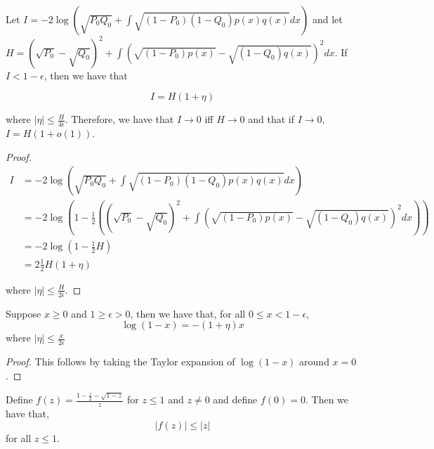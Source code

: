 \documentclass{article}
\begin{document}
\begin{lemma}
\label{lem:renyi_hellinger}
Let $I = -2 \log \left( \sqrt{P_0 Q_0} + \int \sqrt{(1-P_0)(1-Q_0) p(x) q(x)} dx \right)$ and let $H = (\sqrt{P_0} - \sqrt{Q_0})^2 + \int \left( \sqrt{ (1-P_0) p(x)} - \sqrt{ (1-Q_0) q(x)} \right)^2 dx$. If $I < 1- \epsilon$, then we have that

\[
I = H(1+\eta)
\]

where $|\eta| \leq \frac{H}{4\epsilon}$. Therefore, we have that $I \rightarrow 0$ iff $H \rightarrow 0$ and that if $I \rightarrow 0$, $ I = H(1+o(1))$.

\end{lemma}

\begin{proof}

\begin{align*}
I &= -2 \log \left( \sqrt{P_0 Q_0} + \int \sqrt{(1-P_0)(1-Q_0) p(x) q(x)} dx \right) \\
  &= -2 \log \left( 1 - \frac{1}{2} \left( 
                (\sqrt{P_0} - \sqrt{Q_0})^2 + 
               \int (\sqrt{(1-P_0)p(x)} - \sqrt{(1-Q_0)q(x)} )^2 dx \right) \right)\\
 &= -2 \log \left(1 - \frac{1}{2} H \right) \\
  &= 2 \frac{1}{2} H (1 + \eta)
\end{align*}

where $|\eta| \leq \frac{H}{2 \epsilon}$. 
\end{proof}

\begin{lemma}
\label{lem:log_linearize}
Suppose $x \geq 0$ and $1 \geq \epsilon > 0$, then we have that, for all $0 \leq x < 1-\epsilon$,
\[
\log (1 - x) = - (1 + \eta) x 
\]
where $| \eta| \leq \frac{x}{2 \epsilon}$
\end{lemma}

\begin{proof}
This follows by taking the Taylor expansion of $\log (1 - x)$ around $x = 0$.
\end{proof}

\begin{lemma}
\label{lem:sqrt_linearize}
Define $f(z) =  \frac{1 - \frac{z}{2} - \sqrt{ 1 - z}}{z} $ for $z \leq 1$ and $z \neq 0$ and define $f(0) = 0$. Then we have that,
\[
\left| f(z)  \right| \leq |z|
\]
for all $z \leq 1$.
\end{lemma}
\end{document}
